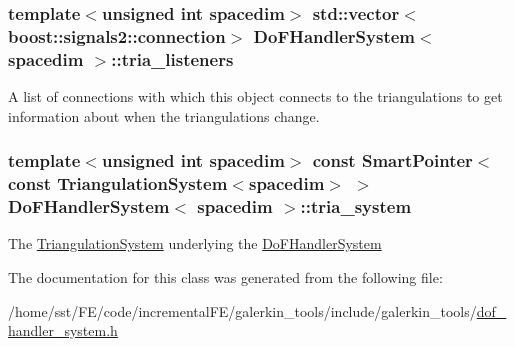 \subsubsection[{\texorpdfstring{tria\+\_\+listeners}{tria_listeners}}]{\setlength{\rightskip}{0pt plus 5cm}template$<$unsigned int spacedim$>$ std\+::vector$<$boost\+::signals2\+::connection$>$ {\bf Do\+F\+Handler\+System}$<$ spacedim $>$\+::tria\+\_\+listeners\hspace{0.3cm}{\ttfamily [private]}}\hypertarget{class_do_f_handler_system_a286776a935dacb3d1c79a90f4ca7e5d8}{}\label{class_do_f_handler_system_a286776a935dacb3d1c79a90f4ca7e5d8}
A list of connections with which this object connects to the triangulations to get information about when the triangulations change. 
\subsubsection[{\texorpdfstring{tria\+\_\+system}{tria_system}}]{\setlength{\rightskip}{0pt plus 5cm}template$<$unsigned int spacedim$>$ const {\bf Smart\+Pointer}$<$const {\bf Triangulation\+System}$<$spacedim$>$ $>$ {\bf Do\+F\+Handler\+System}$<$ spacedim $>$\+::tria\+\_\+system\hspace{0.3cm}{\ttfamily [private]}}\hypertarget{class_do_f_handler_system_a06d93193cb47591db138cd8f41953796}{}\label{class_do_f_handler_system_a06d93193cb47591db138cd8f41953796}
The \hyperlink{class_triangulation_system}{Triangulation\+System} underlying the \hyperlink{class_do_f_handler_system}{Do\+F\+Handler\+System} 

The documentation for this class was generated from the following file\+:\begin{DoxyCompactItemize}
\item 
/home/sst/\+F\+E/code/incremental\+F\+E/galerkin\+\_\+tools/include/galerkin\+\_\+tools/\hyperlink{dof__handler__system_8h}{dof\+\_\+handler\+\_\+system.\+h}\end{DoxyCompactItemize}
